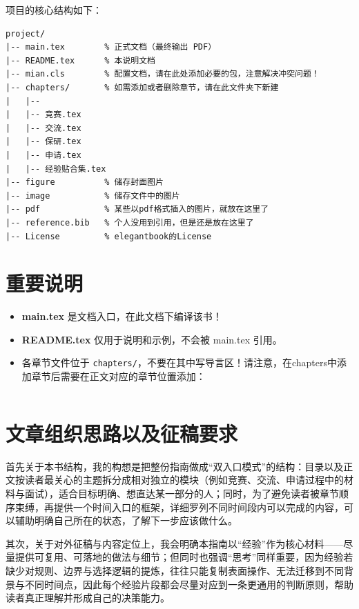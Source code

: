 项目的核心结构如下：
\begin{verbatim}
project/
|-- main.tex        % 正式文档（最终输出 PDF）
|-- README.tex      % 本说明文档
|-- mian.cls        % 配置文档，请在此处添加必要的包，注意解决冲突问题！
|-- chapters/       % 如需添加或者删除章节，请在此文件夹下新建
|   |-- 
|   |-- 竞赛.tex
|   |-- 交流.tex
|   |-- 保研.tex
|   |-- 申请.tex
|   |-- 经验贴合集.tex
|-- figure          % 储存封面图片
|-- image           % 储存文件中的图片
|-- pdf             % 某些以pdf格式插入的图片，就放在这里了
|-- reference.bib   % 个人没用到引用，但是还是放在这里了
|-- License         % elegantbook的License
\end{verbatim}

\section*{重要说明}
\begin{remark}
\begin{itemize}
  \item \textbf{main.tex} 是文档入口，在此文档下编译该书！
  \item \textbf{README.tex} 仅用于说明和示例，不会被 main.tex 引用。
  \item 各章节文件位于 \texttt{chapters/}，不要在其中写导言区！请注意，在chapters中添加章节后需要在正文对应的章节位置添加：
\begin{lstlisting}

\end{lstlisting}
\end{itemize}
\end{remark}
\section{文章组织思路以及征稿要求}


首先关于本书结构，我的构想是把整份指南做成“双入口模式”的结构：目录以及正文按读者最关心的主题拆分成相对独立的模块（例如竞赛、交流、申请过程中的材料与面试），适合目标明确、想直达某一部分的人；同时，为了避免读者被章节顺序束缚，再提供一个时间入口的框架，详细罗列不同时间段内可以完成的内容，可以辅助明确自己所在的状态，了解下一步应该做什么。

其次，关于对外征稿与内容定位上，我会明确本指南以“经验”作为核心材料——尽量提供可复用、可落地的做法与细节；但同时也强调“思考”同样重要，因为经验若缺少对规则、边界与选择逻辑的提炼，往往只能复制表面操作、无法迁移到不同背景与不同时间点，因此每个经验片段都会尽量对应到一条更通用的判断原则，帮助读者真正理解并形成自己的决策能力。

